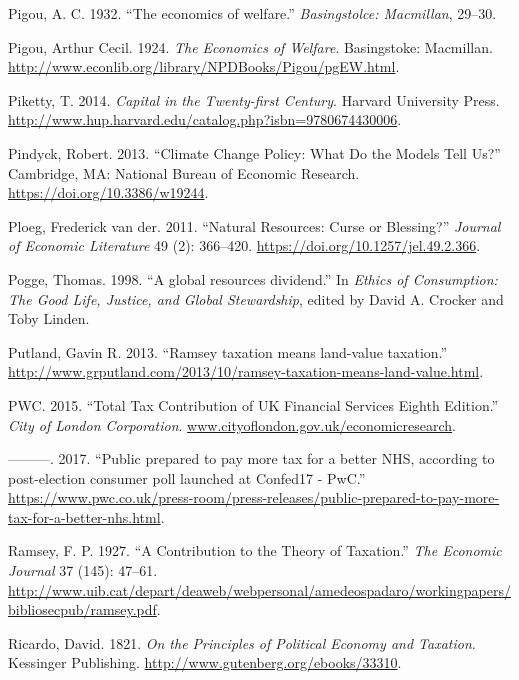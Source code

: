 \documentclass[]{tufte-handout}
\begin{document}
\leavevmode\hypertarget{ref-Pigou1932}{}%
Pigou, A. C. 1932. ``The economics of welfare.'' \emph{Basingstolce:
Macmillan}, 29--30.

\leavevmode\hypertarget{ref-Pigou1924}{}%
Pigou, Arthur Cecil. 1924. \emph{The Economics of Welfare}. Basingstoke:
Macmillan.
\url{http://www.econlib.org/library/NPDBooks/Pigou/pgEW.html}.

\leavevmode\hypertarget{ref-Piketty2014a}{}%
Piketty, T. 2014. \emph{Capital in the Twenty-first Century}. Harvard
University Press.
\url{http://www.hup.harvard.edu/catalog.php?isbn=9780674430006}.

\leavevmode\hypertarget{ref-Pindyck2013}{}%
Pindyck, Robert. 2013. ``Climate Change Policy: What Do the Models Tell
Us?'' Cambridge, MA: National Bureau of Economic Research.
\url{https://doi.org/10.3386/w19244}.

\leavevmode\hypertarget{ref-Ploeg2011}{}%
Ploeg, Frederick van der. 2011. ``Natural Resources: Curse or
Blessing?'' \emph{Journal of Economic Literature} 49 (2): 366--420.
\url{https://doi.org/10.1257/jel.49.2.366}.

\leavevmode\hypertarget{ref-Pogge1998}{}%
Pogge, Thomas. 1998. ``A global resources dividend.'' In \emph{Ethics of
Consumption: The Good Life, Justice, and Global Stewardship}, edited by
David A. Crocker and Toby Linden.

\leavevmode\hypertarget{ref-Putland2013}{}%
Putland, Gavin R. 2013. ``Ramsey taxation means land-value taxation.''
\url{http://www.grputland.com/2013/10/ramsey-taxation-means-land-value.html}.

\leavevmode\hypertarget{ref-PWC2015}{}%
PWC. 2015. ``Total Tax Contribution of UK Financial Services Eighth
Edition.'' \emph{City of London Corporation}.
\url{www.cityoflondon.gov.uk/economicresearch}.

\leavevmode\hypertarget{ref-PWC2017}{}%
---------. 2017. ``Public prepared to pay more tax for a better NHS,
according to post-election consumer poll launched at Confed17 - PwC.''
\url{https://www.pwc.co.uk/press-room/press-releases/public-prepared-to-pay-more-tax-for-a-better-nhs.html}.

\leavevmode\hypertarget{ref-Ramsey1927}{}%
Ramsey, F. P. 1927. ``A Contribution to the Theory of Taxation.''
\emph{The Economic Journal} 37 (145): 47--61.
\url{http://www.uib.cat/depart/deaweb/webpersonal/amedeospadaro/workingpapers/bibliosecpub/ramsey.pdf}.

\leavevmode\hypertarget{ref-ricardo1821principles}{}%
Ricardo, David. 1821. \emph{On the Principles of Political Economy and
Taxation}. Kessinger Publishing.
\url{http://www.gutenberg.org/ebooks/33310}.
\end{document}
